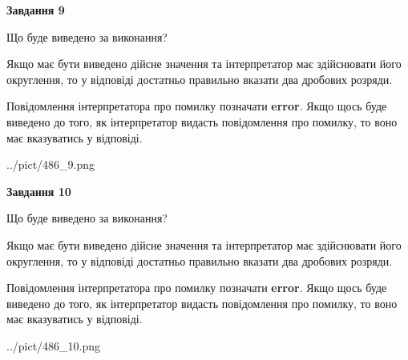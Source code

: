 \documentclass[12pt, ukrainian]{article}
\begin{document}
{\begin {Large}
{\begin {center}\textbf{Завдання 9}\end {center}}\par
Що буде виведено за виконання? \par

Якщо має бути виведено дійсне значення та інтерпретатор має здійснювати його округлення, 
то у відповіді достатньо правильно вказати два дробових розряди.

Повідомлення інтерпретатора про помилку позначати \textbf{error}.
Якщо щось буде виведено до того, як інтерпретатор видасть повідомлення про помилку, 
то воно має вказуватись у відповіді. \par

\begin{center}
	{../pict/486_9.png}
\end{center}
\newpage

{\begin {center}\textbf{Завдання 10}\end {center}}\par
Що буде виведено за виконання? \par

Якщо має бути виведено дійсне значення та інтерпретатор має здійснювати його округлення, 
то у відповіді достатньо правильно вказати два дробових розряди.

Повідомлення інтерпретатора про помилку позначати \textbf{error}.
Якщо щось буде виведено до того, як інтерпретатор видасть повідомлення про помилку, 
то воно має вказуватись у відповіді. \par

\begin{center}
	{../pict/486_10.png}
\end{center}
\newpage

\end {Large}}
\end{document}
